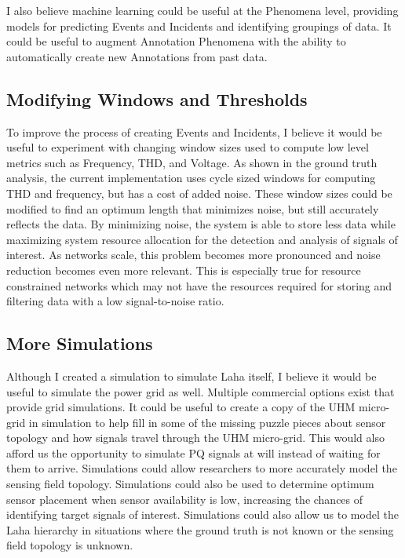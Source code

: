 I also believe machine learning could be useful at the Phenomena level, providing models for predicting Events and Incidents and identifying groupings of data. It could be useful to augment Annotation Phenomena with the ability to automatically create new Annotations from past data.

\subsection{Modifying Windows and Thresholds}\label{subsec:modifying-windows-and-thresholds}
To improve the process of creating Events and Incidents, I believe it would be useful to experiment with changing window sizes used to compute low level metrics such as Frequency, THD, and Voltage. As shown in the ground truth analysis, the current implementation uses cycle sized windows for computing THD and frequency, but has a cost of added noise. These window sizes could be modified to find an optimum length that minimizes noise, but still accurately reflects the data. By minimizing noise, the system is able to store less data while maximizing system resource allocation for the detection and analysis of signals of interest. As networks scale, this problem becomes more pronounced and noise reduction becomes even more relevant. This is especially true for resource constrained networks which may not have the resources required for storing and filtering data with a low signal-to-noise ratio.

\subsection{More Simulations}\label{subsec:more-simulations}
Although I created a simulation to simulate Laha itself, I believe it would be useful to simulate the power grid as well. Multiple commercial options exist that provide grid simulations. It could be useful to create a copy of the UHM micro-grid in simulation to help fill in some of the missing puzzle pieces about sensor topology and how signals travel through the UHM micro-grid. This would also afford us the opportunity to simulate PQ signals at will instead of waiting for them to arrive. Simulations could allow researchers to more accurately model the sensing field topology. Simulations could also be used to determine optimum sensor placement when sensor availability is low, increasing the chances of identifying target signals of interest. Simulations could also allow us to model the Laha hierarchy in situations where the ground truth is not known or the sensing field topology is unknown.

